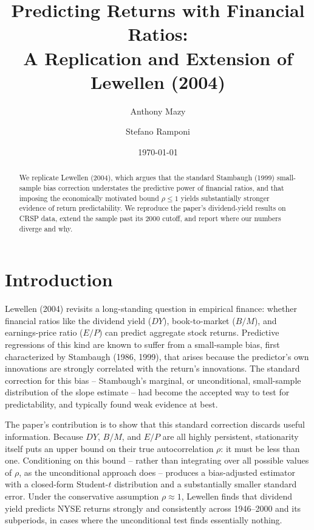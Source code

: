 \documentclass[11pt]{article}
\title{Predicting Returns with Financial Ratios:\\
       A Replication and Extension of Lewellen (2004)}
\author{Anthony Mazy \and Stefano Ramponi}
\date{\today}
\newcommand{\PathToOutput}{../_output}
\begin{document}
\maketitle







\begin{abstract}
We replicate Lewellen (2004), which argues that the standard Stambaugh (1999)
small-sample bias correction understates the predictive power of financial
ratios, and that imposing the economically motivated bound $\rho \le 1$ yields
substantially stronger evidence of return predictability. We reproduce the
paper's dividend-yield results on CRSP data, extend the sample past its 2000
cutoff, and report where our numbers diverge and why.
\end{abstract}

\section{Introduction}
\label{sec:introduction}

Lewellen (2004) revisits a long-standing question in empirical finance:
whether financial ratios like the dividend yield (\(DY\)), book-to-market
(\(B/M\)), and earnings-price ratio (\(E/P\)) can predict aggregate stock
returns. Predictive regressions of this kind are known to suffer from a
small-sample bias, first characterized by Stambaugh (1986, 1999), that
arises because the predictor's own innovations are strongly correlated with
the return's innovations. The standard correction for this bias --
Stambaugh's marginal, or unconditional, small-sample distribution of the
slope estimate -- had become the accepted way to test for predictability,
and typically found weak evidence at best.

The paper's contribution is to show that this standard correction discards
useful information. Because \(DY\), \(B/M\), and \(E/P\) are all highly
persistent, stationarity itself puts an upper bound on their true
autocorrelation \(\rho\): it must be less than one. Conditioning on this
bound -- rather than integrating over all possible values of \(\rho\), as
the unconditional approach does -- produces a bias-adjusted estimator with a
closed-form Student-\(t\) distribution and a substantially smaller standard
error. Under the conservative assumption \(\rho \approx 1\), Lewellen finds
that dividend yield predicts NYSE returns strongly and consistently across
1946--2000 and its subperiods, in cases where the unconditional test finds
essentially nothing.
\end{document}
